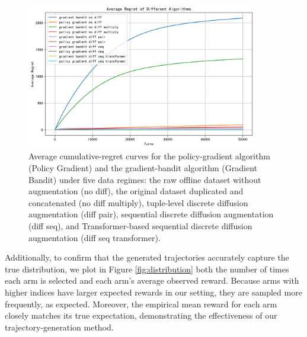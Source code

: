 \begin{figure}[htbp]
    \centering
    \includegraphics[width=0.9\textwidth]{./Img/stochastic_bandit/compare_gradient_bandit.png}
    \caption{Average cumulative-regret curves for the policy-gradient algorithm (Policy Gradient) and the gradient-bandit algorithm (Gradient Bandit) under five data regimes: the raw offline dataset without augmentation (no diff), the original dataset duplicated and concatenated (no diff multiply), tuple-level discrete diffusion augmentation (diff pair), sequential discrete diffusion augmentation (diff seq), and Transformer-based sequential discrete diffusion augmentation (diff seq transformer).}
    \label{fig:compare_gradient_bandit}
\end{figure}



Additionally, to confirm that the generated trajectories accurately capture the true distribution, we plot in Figure \ref{fig:distribution} both the number of times each arm is selected and each arm’s average observed reward. Because arms with higher indices have larger expected rewards in our setting, they are sampled more frequently, as expected. Moreover, the empirical mean reward for each arm closely matches its true expectation, demonstrating the effectiveness of our trajectory‐generation method.

